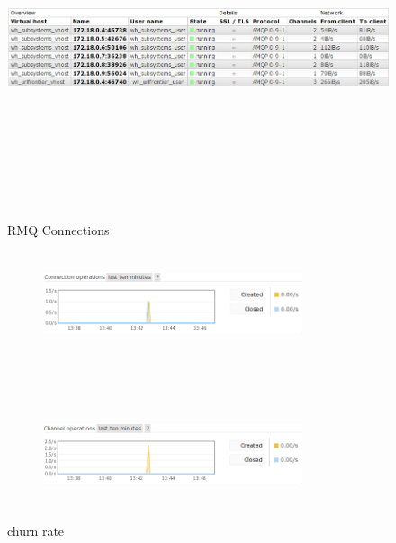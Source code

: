 \begin{figure}[h!]
  \centering
  \includegraphics[width=16cm,height=10cm,keepaspectratio]{../media/crawler/rmq_connections.png}
  \caption{RMQ Connections}
  \label{fig:rmqconn}
\end{figure}

\begin{figure}[h!]
    \centering
    \begin{subfigure}
        \centering
        \includegraphics[width=3in, height=1.2in]{../media/crawler/churn_stats_conn.png}
    \end{subfigure}%
    ~ 
    \begin{subfigure}
        \centering
        \includegraphics[width=3in, height=1.2in]{../media/crawler/churn_stats_channel.png}
    \end{subfigure}
    \caption{churn rate}
    \label{fig:churn_stats}
\end{figure}

